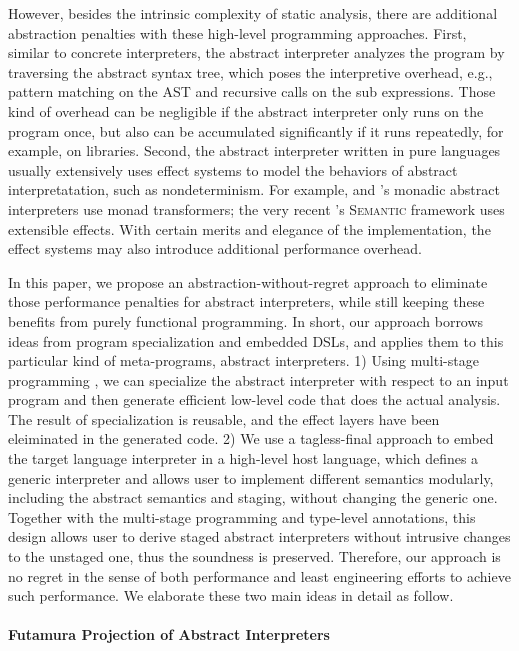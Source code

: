 However, besides the intrinsic complexity of static analysis, there are
additional abstraction penalties with these high-level programming approaches.
First, similar to concrete interpreters, the abstract interpreter analyzes the
program by traversing the abstract syntax tree, which poses the interpretive
overhead, e.g., pattern matching on the AST and recursive calls on the sub
expressions. Those kind of overhead can be negligible if the abstract
interpreter only runs on the program once, but also can be accumulated
significantly if it runs repeatedly, for example, on libraries. Second, the
abstract interpreter written in pure languages usually extensively uses effect
systems to model the behaviors of abstract interpretatation, such as
nondeterminism. For example, \citet{DBLP:journals/pacmpl/DaraisLNH17} and
\citet{Sergey:2013:MAI:2491956.2491979}'s monadic abstract interpreters use
monad transformers; the very recent \citet{Githubsemantic}'s \textsc{Semantic} framework
uses extensible effects. With certain merits and elegance of the implementation,
the effect systems may also introduce additional performance overhead.

In this paper, we propose an abstraction-without-regret approach to
eliminate those performance penalties for abstract interpreters, while
still keeping these benefits from purely functional programming.  In
short, our approach borrows ideas from program specialization and
embedded DSLs, and applies them to this particular kind of
meta-programs, abstract interpreters.  1) Using multi-stage
programming , we can specialize the
abstract interpreter with respect to an input program and then
generate efficient low-level code that does the actual analysis. The
result of specialization is reusable, and the effect layers have been
eleiminated in the generated code. 2) We use a tagless-final approach
to embed the target language interpreter in a high-level host language,
which defines a generic interpreter and allows user to
implement different semantics modularly, including the abstract
semantics and staging, without changing the generic one.
Together with the multi-stage programming and type-level
annotations, this design allows user to derive staged abstract
interpreters without intrusive changes to the unstaged one, thus the soundness is preserved. 
Therefore, our approach is no regret in the sense of both performance and least
engineering efforts to achieve such performance. We elaborate these
two main ideas in detail as follow.

\paragraph{Futamura Projection of Abstract Interpreters}

